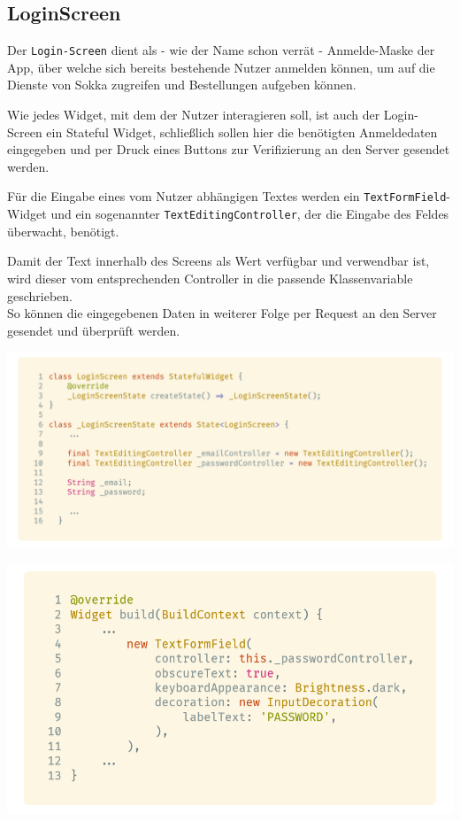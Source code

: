 \subsection{LoginScreen}

Der \lstinline{Login-Screen} dient als - wie der Name schon verrät - Anmelde-Maske der App, über 
welche sich bereits bestehende Nutzer anmelden können, um auf die Dienste von Sokka zugreifen und
Bestellungen aufgeben können.

Wie jedes Widget, mit dem der Nutzer interagieren soll, ist auch der Login-Screen ein Stateful 
Widget, schließlich sollen hier die benötigten Anmeldedaten eingegeben und per Druck eines Buttons
zur Verifizierung an den Server gesendet werden.

Für die Eingabe eines vom Nutzer abhängigen Textes werden ein \lstinline{TextFormField}-Widget
und ein sogenannter \lstinline{TextEditingController}, der die Eingabe des Feldes überwacht,
benötigt.

Damit der Text innerhalb des Screens als Wert verfügbar und verwendbar ist, wird dieser vom entsprechenden
Controller in die passende Klassenvariable geschrieben.\\
So können die eingegebenen Daten in weiterer Folge per Request an den Server gesendet und überprüft werden.

\begin{code}[h]
    \centering
    \includegraphics[width=1\textwidth]{images/Client/screens/login/loginScreenTextController.png}
    \caption{Login-Screen als Stateful Widget mit \lstinline{TextEditingControllers} für E-Mail und Passwort}
\end{code}

\newpage

\begin{code}[h]
    \centering
    \includegraphics[width=1\textwidth]{images/Client/screens/login/loginScreenTextField.png}
    \caption{}
\end{code}

